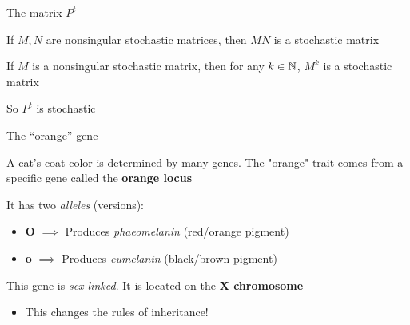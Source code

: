 \documentclass[aspectratio=169]{beamer}\usepackage[]{graphicx}\usepackage[]{xcolor}
\begin{document}
\begin{frame}{The matrix $P^t$}
\begin{theorem}
If $M,N$ are nonsingular stochastic matrices, then $MN$ is a stochastic matrix
\end{theorem}
\vfill
\begin{corollary}
If $M$ is a nonsingular stochastic matrix, then for any $k\in\mathbb{N}$, $M^k$ is a stochastic matrix
\end{corollary}
\vfill
So $P^t$ is stochastic
\end{frame}




\begin{frame}{The ``orange'' gene}
    
    A cat's coat color is determined by many genes. The "orange" trait comes from a specific gene called the \textbf{orange locus}
    
    \vfill
    
    It has two \emph{alleles} (versions):
    \begin{itemize}
        \item \textbf{O} $\implies$ Produces \emph{phaeomelanin} (red/orange pigment)
        \item \textbf{o} $\implies$ Produces \emph{eumelanin} (black/brown pigment)
    \end{itemize}
    
    \vfill
    
    This gene is \emph{sex-linked}. It is located on the \textbf{X chromosome}
    \begin{itemize}
        \item This changes the rules of inheritance!
    \end{itemize}
    
\end{frame}
\end{document}
